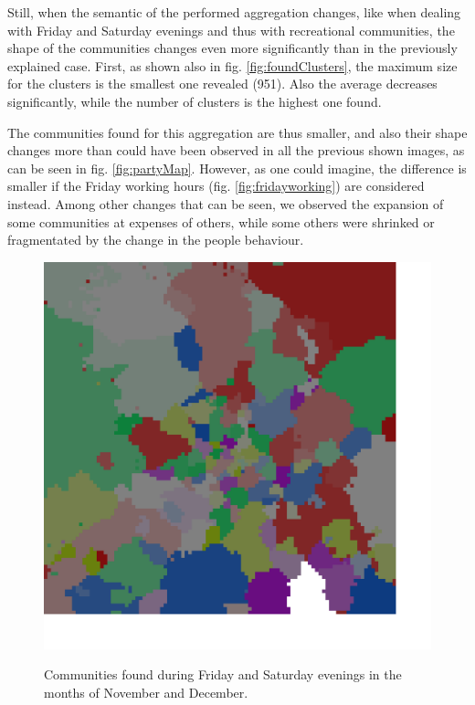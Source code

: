 \documentclass[12pt,a4paper]{article}
\begin{document}
Still, when the semantic of the performed aggregation changes, like when dealing with Friday and Saturday evenings and thus with recreational communities, the shape of the communities changes even more significantly than in the previously explained case.
First, as shown also in fig. \ref{fig:foundClusters}, the maximum size for the clusters is the smallest one revealed (951). Also the average decreases significantly, while the number of clusters is the highest one found.

The communities found for this aggregation are thus smaller, and also their shape changes more than could have been observed in all the previous shown images, as can be seen in fig. \ref{fig:partyMap}. However, as one could imagine, the difference is smaller if the Friday working hours (fig. \ref{fig:fridayworking}) are considered instead.
Among other changes that can be seen, we observed the expansion of some communities at expenses of others, while some others were shrinked or fragmentated by the change in the people behaviour. 

\begin{figure}[H]
\includegraphics[width=\linewidth]{week/6Sat.png}
\label{fig:wednesdayworking}
\caption{Communities found during Friday and Saturday evenings in the months of November and December.}
\end{figure}
\end{document}
